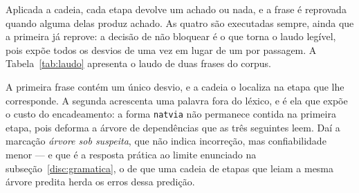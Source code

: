 Aplicada a cadeia, cada etapa devolve um achado ou nada, e a frase é reprovada quando alguma
delas produz achado. As quatro são executadas sempre, ainda que a primeira já reprove: a
decisão de não bloquear é o que torna o laudo legível, pois expõe todos os desvios de uma vez
em lugar de um por passagem. A Tabela~\ref{tab:laudo} apresenta o laudo de duas frases do
corpus.

\begin{table}[H]
\centering
{}
\caption{Laudo da cadeia sobre duas frases. $^\dagger$ etapa marcada como \emph{árvore sob
suspeita}, por ler uma árvore construída sobre palavra fora do léxico.}
\label{tab:laudo}
\end{table}

A primeira frase contém um único desvio, e a cadeia o localiza na etapa que lhe corresponde. A
segunda acrescenta uma palavra fora do léxico, e é ela que expõe o custo do encadeamento: a
forma \texttt{natvia} não permanece contida na primeira etapa, pois deforma a árvore de
dependências que as três seguintes leem. Daí a marcação \emph{árvore sob suspeita}, que não
indica incorreção, mas confiabilidade menor --- e que é a resposta prática ao limite enunciado
na subseção~\ref{disc:gramatica}, o de que uma cadeia de etapas que leiam a mesma árvore
predita herda os erros dessa predição.

